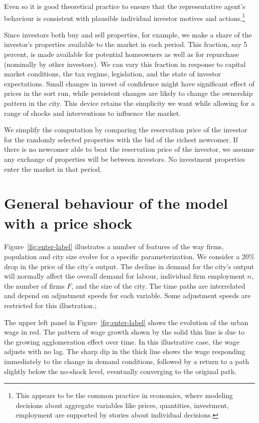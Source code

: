 Even so it is good theoretical practice to ensure that the representative agent's behaviour is consistent with plausible individual investor motives and actions.\footnote{This appears to be the common practice in economics, where modeling decisions about aggregate variables like prices, quantities, investment, employment are supported by stories about individual decisions.} 

Since investors both buy and sell properties, for example, we make a share of the investor's properties available to the market in each period. This fraction, say 5 percent, is made available for potential homeowners as well as for repurchase (nominally by other investors). We can vary this fraction in response to capital market conditions, the tax regime, legislation, and the state of investor expectations. Small changes in invest of confidence might have significant effect of prices in the sort run, while persistent changes are likely to change the ownership pattern in the city. This device retains the simplicity we want while allowing for a range of shocks and interventions to influence the market.

We simplify the computation by comparing the reservation price of the investor for the randomly selected properties with the bid of the richest newcomer. If there is no newcomer able to beat the reservation price of the investor, we assume any exchange of properties will be between investors. No investment properties enter the market in that period. 

\section{General behaviour of the model with a price shock}


Figure~\ref{fig:enter-label} illustrates a number of features of the way firms, population and city size evolve for a specific parameterization. %
We consider a 20\% drop in  the price of the city's output. The decline in demand for the city's output will normally affect the overall demand for labour, individual firm employment $n$, the number of firms $F$, and the size of the city. The time paths are interrelated and depend on adjustment speeds for each variable. Some  adjustment speeds are restricted  for this illustration.;

The upper left panel in Figure~\ref{fig:enter-label} shows the evolution of the urban wage  in red. The pattern of wage growth shown by the solid thin line  is due to the growing agglomeration effect over time. In this illustrative case, the wage adjusts with no lag. The sharp dip in the thick  line shows the wage responding immediately to the change in demand conditions, followed by a return to a path slightly below the no-shock level,  eventually converging to the original path. 


